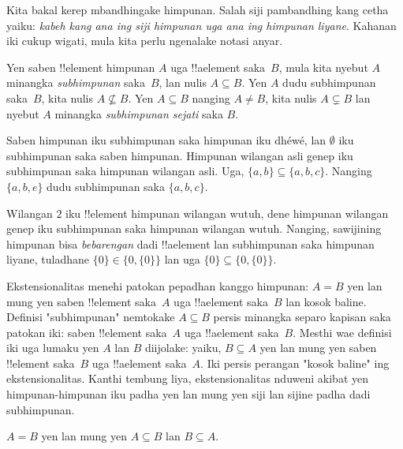 \documentclass[../../../include/open-logic-section]{subfiles}
\begin{document}

\begin{explain}
Kita bakal kerep mbandhingake himpunan. Salah siji pambandhing kang
cetha yaiku: \emph{kabeh kang ana ing siji himpunan uga ana ing
himpunan liyane}. Kahanan iki cukup wigati, mula kita perlu
ngenalake notasi anyar.
\end{explain}

\begin{defn}[Subhimpunan]
Yen saben !!{element} himpunan $A$ uga !!a{element} saka~$B$,
mula kita nyebut $A$ minangka \emph{subhimpunan} saka~$B$, lan
nulis $A \subseteq B$. Yen $A$ dudu subhimpunan saka~$B$, kita
nulis $A \not\subseteq B$.
Yen $A \subseteq B$ nanging $A \neq B$, kita nulis $A \subsetneq B$
lan nyebut $A$ minangka \emph{subhimpunan sejati} saka $B$.
\end{defn}

\begin{ex}
Saben himpunan iku subhimpunan saka himpunan iku dhéwé, lan $\emptyset$
iku subhimpunan saka saben himpunan. Himpunan wilangan asli genep
iku subhimpunan saka himpunan wilangan asli.
Uga, $\{ a, b \} \subseteq \{ a, b, c \}$. Nanging
$\{ a, b, e\}$ dudu subhimpunan saka $\{ a, b, c \}$.
\end{ex}

\begin{ex}
Wilangan $2$ iku !!{element} himpunan wilangan wutuh, dene
himpunan wilangan genep iku subhimpunan saka himpunan wilangan
wutuh. Nanging, sawijining himpunan bisa \emph{bebarengan} dadi
!!a{element} lan subhimpunan saka himpunan liyane, tuladhane
$\{0\} \in \{0, \{0\}\}$ lan uga $\{0\} \subseteq \{0,
\{0\}\}$.
\end{ex}

Ekstensionalitas menehi patokan pepadhan kanggo himpunan:
$A = B$ yen lan mung yen saben !!{element} saka~$A$ uga
!!a{element} saka~$B$ lan kosok baline. Definisi "subhimpunan"
nemtokake $A \subseteq B$ persis minangka separo kapisan saka
patokan iki: saben !!{element} saka~$A$ uga !!a{element} saka~$B$.
Mesthi wae definisi iki uga lumaku yen $A$ lan $B$ diijolake:
yaiku, $B \subseteq A$ yen lan mung yen saben !!{element}
saka~$B$ uga !!a{element} saka~$A$. Iki persis perangan
"kosok baline" ing ekstensionalitas. Kanthi tembung liya,
ekstensionalitas nduweni akibat yen himpunan-himpunan iku padha
yen lan mung yen siji lan sijine padha dadi subhimpunan.

\begin{prop}
$A = B$ yen lan mung yen $A \subseteq B$ lan $B \subseteq A$.
\end{prop}
\end{document}
